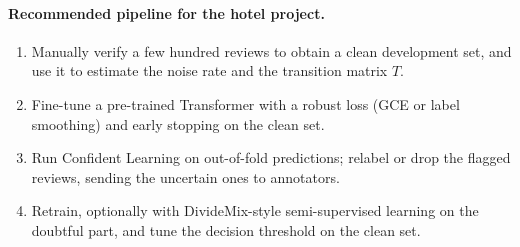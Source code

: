 \paragraph{Recommended pipeline for the hotel project.}
\begin{enumerate}
  \item Manually verify a few hundred reviews to obtain a clean development set, and use it to estimate the noise rate and the transition matrix $T$.
  \item Fine-tune a pre-trained Transformer with a robust loss (GCE or label smoothing) and early stopping on the clean set.
  \item Run Confident Learning on out-of-fold predictions; relabel or drop the flagged reviews, sending the uncertain ones to annotators.
  \item Retrain, optionally with DivideMix-style semi-supervised learning on the doubtful part, and tune the decision threshold on the clean set.
\end{enumerate}
